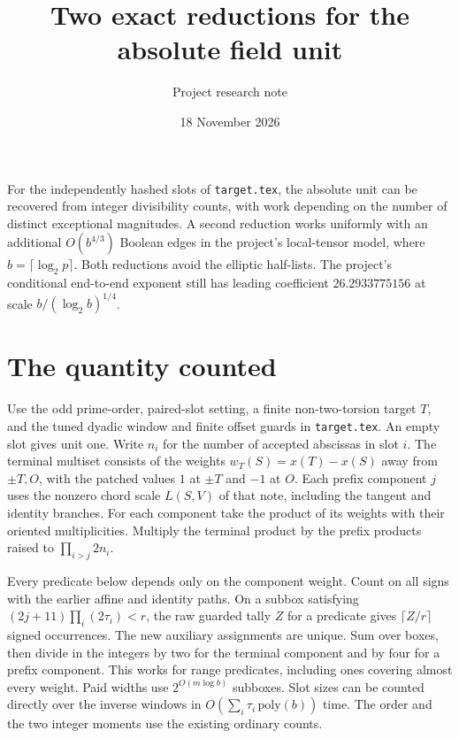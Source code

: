 \documentclass[11pt]{article}
\title{Two exact reductions for the absolute field unit}
\author{Project research note}
\date{18 November 2026}
\begin{document}
\maketitle

For the independently hashed slots of \texttt{target.tex}, the absolute unit
can be recovered from integer divisibility counts, with work depending on
the number of distinct exceptional magnitudes. A second reduction works
uniformly with an additional $O(b^{4/3})$ Boolean edges in the project's
local-tensor model, where $b=\lceil\log_2 p\rceil$.
Both reductions avoid the elliptic half-lists. The project's conditional
end-to-end exponent still has leading coefficient $26.2933775156$ at scale
$b/(\log_2 b)^{1/4}$.

\section{The quantity counted}
Use the odd prime-order, paired-slot setting, a finite non-two-torsion
target $T$, and the tuned dyadic window and finite offset guards in
\texttt{target.tex}. An empty slot gives unit one. Write $n_i$ for the
number of accepted abscissas in slot $i$. The terminal multiset consists
of the weights $w_T(S)=x(T)-x(S)$ away from $\pm T,O$, with the patched
values $1$ at $\pm T$ and $-1$ at $O$. Each prefix component $j$ uses the
nonzero chord scale $L(S,V)$ of that note, including the tangent and
identity branches. For each component take the product of its weights
with their oriented multiplicities. Multiply the terminal product by
the prefix products raised to $\prod_{i>j}2n_i$.

Every predicate below depends only on the component weight. Count on all
signs with the earlier affine and identity paths. On a subbox satisfying
$(2j+11)\prod_i(2\tau_i)<r$, the raw guarded tally $Z$ for a predicate
gives $\lceil Z/r\rceil$ signed occurrences. The new auxiliary assignments
are unique. Sum over boxes, then divide in the integers by two for the
terminal component and by four for a prefix component. This works for
range predicates, including ones covering almost every weight. Paid
widths use $2^{O(m\log b)}$ subboxes. Slot sizes can be counted directly
over the inverse windows in $O(\sum_i\tau_i\,\mathrm{poly}(b))$ time.
The order and the two integer moments use the existing ordinary counts.
\end{document}
